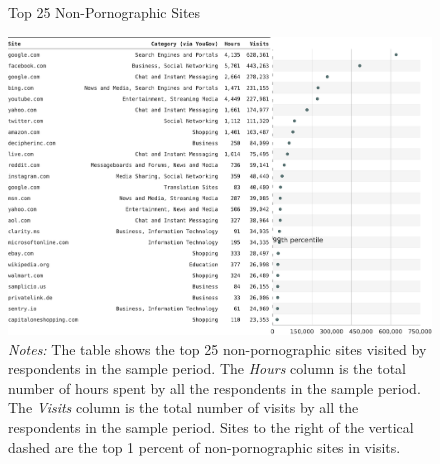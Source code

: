 \documentclass[12pt,twoside]{article}
\begin{document}
\begin{figure}[h]
	\centering
	\caption{Top 25 Non-Pornographic Sites}
	\includegraphics[width=\textwidth]{figs/top_25_nonadultsites.pdf}
	\caption*{\footnotesize \emph{Notes:} 
		The table shows the top 25 non-pornographic sites visited by respondents in the sample period.
		The \emph{Hours} column is the total number of hours spent by all the respondents in the sample period.
    	The \emph{Visits} column is the total number of visits by all the respondents in the sample period.			
		Sites to the right of the vertical dashed are the top 1 percent of non-pornographic sites in visits.
	}
	\label{fig:top25_nonadult}
\end{figure}
\end{document}
